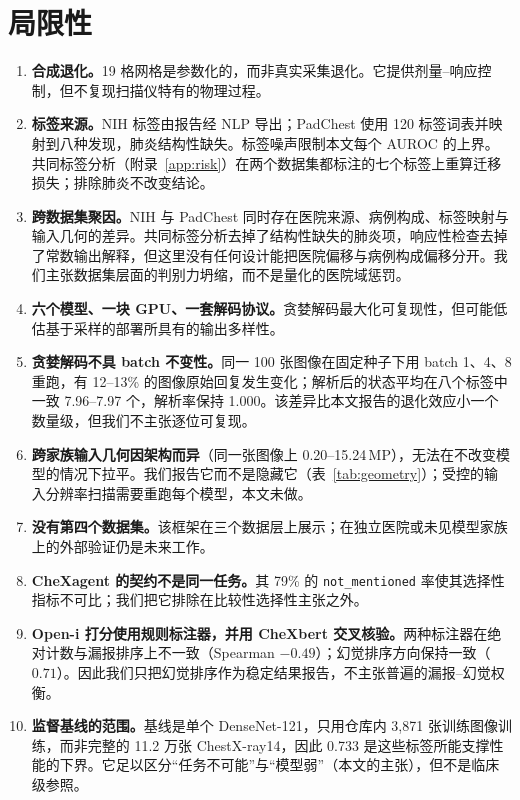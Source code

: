 \section*{局限性}
\label{sec:limitations}

\begin{enumerate}[leftmargin=1.2em,itemsep=2pt,topsep=2pt]
\item \textbf{合成退化。}19 格网格是参数化的，而非真实采集退化。它提供剂量--响应控制，但不复现扫描仪特有的物理过程。
\item \textbf{标签来源。}NIH 标签由报告经 NLP 导出；PadChest 使用 120 标签词表并映射到八种发现，肺炎结构性缺失。标签噪声限制本文每个 AUROC 的上界。共同标签分析（附录~\ref{app:risk}）在两个数据集都标注的七个标签上重算迁移损失；排除肺炎不改变结论。
\item \textbf{跨数据集聚因。}NIH 与 PadChest 同时存在医院来源、病例构成、标签映射与输入几何的差异。共同标签分析去掉了结构性缺失的肺炎项，响应性检查去掉了常数输出解释，但这里没有任何设计能把医院偏移与病例构成偏移分开。我们主张数据集层面的判别力坍缩，而不是量化的医院域惩罚。
\item \textbf{六个模型、一块 GPU、一套解码协议。}贪婪解码最大化可复现性，但可能低估基于采样的部署所具有的输出多样性。
\item \textbf{贪婪解码不具 batch 不变性。}同一 100 张图像在固定种子下用 batch 1、4、8 重跑，有 12--13\% 的图像原始回复发生变化；解析后的状态平均在八个标签中一致 7.96--7.97 个，解析率保持 1.000。该差异比本文报告的退化效应小一个数量级，但我们不主张逐位可复现。
\item \textbf{跨家族输入几何因架构而异}（同一张图像上 0.20--15.24\,MP），无法在不改变模型的情况下拉平。我们报告它而不是隐藏它（表~\ref{tab:geometry}）；受控的输入分辨率扫描需要重跑每个模型，本文未做。
\item \textbf{没有第四个数据集。}该框架在三个数据层上展示；在独立医院或未见模型家族上的外部验证仍是未来工作。
\item \textbf{CheXagent 的契约不是同一任务。}其 79\% 的 \texttt{not\_mentioned} 率使其选择性指标不可比；我们把它排除在比较性选择性主张之外。
\item \textbf{Open-i 打分使用规则标注器，并用 CheXbert 交叉核验。}两种标注器在绝对计数与漏报排序上不一致（Spearman $-0.49$）；幻觉排序方向保持一致（$0.71$）。因此我们只把幻觉排序作为稳定结果报告，不主张普遍的漏报--幻觉权衡。
\item \textbf{监督基线的范围。}基线是单个 DenseNet-121，只用仓库内 3,871 张训练图像训练，而非完整的 11.2 万张 ChestX-ray14，因此 0.733 是这些标签所能支撑性能的下界。它足以区分``任务不可能''与``模型弱''（本文的主张），但不是临床级参照。

\end{enumerate}
